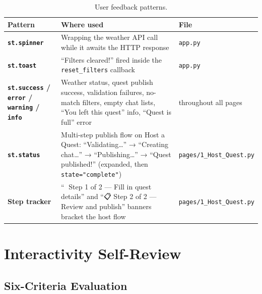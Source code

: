 \documentclass[11pt]{article}
\begin{document}
\begin{table}[h!]
\centering
\begin{tabularx}{\textwidth}{>{\bfseries}l X l}
\toprule
Pattern & Where used & File \\
\midrule
\texttt{st.spinner} & Wrapping the weather API call while it awaits the HTTP response & \texttt{app.py} \\
\addlinespace
\texttt{st.toast} & ``Filters cleared!'' fired inside the \texttt{reset\_filters} callback & \texttt{app.py} \\
\addlinespace
\texttt{st.success} / \texttt{error} / \texttt{warning} / \texttt{info} & Weather status, quest publish success, validation failures, no-match filters, empty chat lists, ``You left this quest'' info, ``Quest is full'' error & throughout all pages \\
\addlinespace
\texttt{st.status} & Multi-step publish flow on Host a Quest: ``Validating…'' → ``Creating chat…'' → ``Publishing…'' → ``Quest published!'' (expanded, then \texttt{state="complete"}) & \texttt{pages/1\_Host\_Quest.py} \\
\addlinespace
Step tracker & ``📝 Step 1 of 2 --- Fill in quest details'' and ``📋 Step 2 of 2 --- Review and publish'' banners bracket the host flow & \texttt{pages/1\_Host\_Quest.py} \\
\bottomrule
\end{tabularx}
\caption{User feedback patterns.}
\end{table}

\section{Interactivity Self-Review}

\subsection{Six-Criteria Evaluation}
\end{document}
